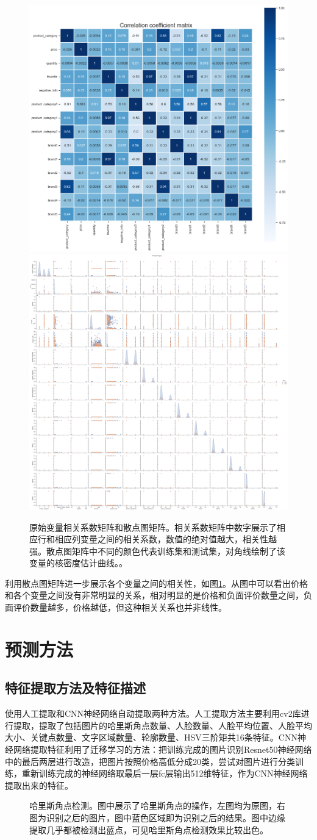\documentclass{article}
\begin{document}
\begin{figure}[!tbph]
	\centering
	\includegraphics[width=0.45\linewidth]{figures/原变量相关系数矩阵}
	\includegraphics[width=0.45\linewidth]{figures/散点图矩阵}
	\caption{原始变量相关系数矩阵和散点图矩阵。相关系数矩阵中数字展示了相应行和相应列变量之间的相关系数，数值的绝对值越大，相关性越强。散点图矩阵中不同的颜色代表训练集和测试集，对角线绘制了该变量的核密度估计曲线。。}
	\label{fig:原变量相关系数矩阵}
\end{figure}
\par 利用散点图矩阵进一步展示各个变量之间的相关性，如图\ref{fig:原变量相关系数矩阵}。从图中可以看出价格和各个变量之间没有非常明显的关系，相对明显的是价格和负面评价数量之间，负面评价数量越多，价格越低，但这种相关关系也并非线性。

\section{预测方法}
\subsection{特征提取方法及特征描述}
使用人工提取和CNN神经网络自动提取两种方法。人工提取方法主要利用cv2库进行提取，提取了包括图片的哈里斯角点数量、人脸数量、人脸平均位置、人脸平均大小、关键点数量、文字区域数量、轮廓数量、HSV三阶矩共16条特征。CNN神经网络提取特征利用了迁移学习的方法：把训练完成的图片识别Resnet50神经网络\cite{Resnet50}中的最后两层进行改造，把图片按照价格高低分成20类，尝试对图片进行分类训练，重新训练完成的神经网络取最后一层fc层输出512维特征，作为CNN神经网络提取出来的特征。
\begin{figure}[!htbp]
	\centering
	\caption{哈里斯角点检测。图中展示了哈里斯角点的操作，左图均为原图，右图为识别之后的图片，图中蓝色区域即为识别之后的结果。图中边缘提取几乎都被检测出蓝点，可见哈里斯角点检测效果比较出色。}
	\label{图：人工特征}
\end{figure}
\end{document}
